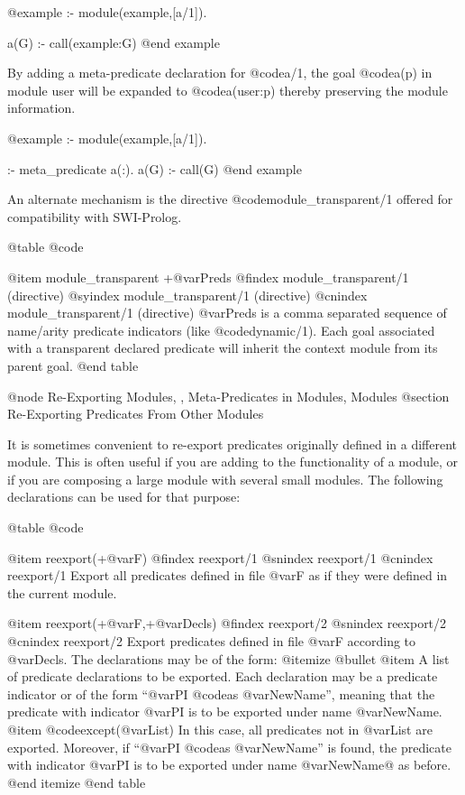 {{{{@example
:- module(example,[a/1]).

a(G) :- call(example:G)
@end example

By adding a meta-predicate declaration for @code{a/1}, the goal
@code{a(p)} in module user will be expanded to @code{a(user:p)}
thereby preserving the module information.

@example
:- module(example,[a/1]).

:- meta_predicate a(:).
a(G) :- call(G)
@end example

An alternate mechanism is the directive @code{module_transparent/1}
offered for compatibility with SWI-Prolog.

@table @code

@item module_transparent +@var{Preds}
@findex module_transparent/1 (directive)
@syindex module_transparent/1 (directive)
@cnindex module_transparent/1 (directive)
     @var{Preds} is a comma separated sequence of name/arity predicate
     indicators (like
    @code{dynamic/1}). Each goal associated with a transparent declared
    predicate will inherit the context module from its parent goal.
@end table


@node Re-Exporting Modules, , Meta-Predicates in Modules, Modules
@section Re-Exporting Predicates From Other Modules

It is sometimes convenient to re-export predicates originally defined in
a different module. This is often useful if you are adding to the
functionality of a module, or if you are composing a large module with
several small modules. The following declarations can be used for that purpose:

@table @code

@item reexport(+@var{F})
@findex reexport/1
@snindex reexport/1
@cnindex reexport/1
Export all predicates defined in file @var{F} as if they were defined in
the current module.

@item reexport(+@var{F},+@var{Decls})
@findex reexport/2
@snindex reexport/2
@cnindex reexport/2
Export predicates defined in file @var{F} according to @var{Decls}. The
declarations may be of the form:
@itemize @bullet
@item A list of predicate declarations to be exported. Each declaration
may be a predicate indicator or of the form ``@var{PI} @code{as}
@var{NewName}'', meaning that the predicate with indicator @var{PI} is
to be exported under name @var{NewName}.
@item @code{except}(@var{List}) 
In this case, all predicates not in @var{List} are exported. Moreover,
if ``@var{PI} @code{as} @var{NewName}'' is found, the predicate with
indicator @var{PI} is to be exported under name @var{NewName}@ as
before.
@end itemize
@end table

}}}}
